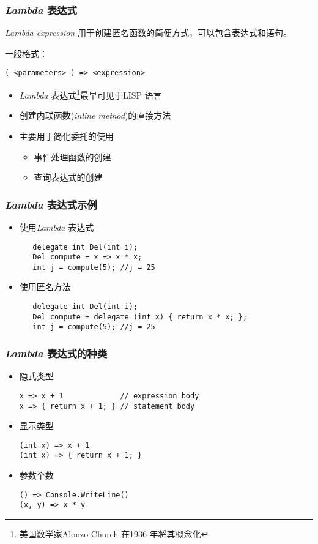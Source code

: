 \begin{frame}[fragile]
\frametitle{\textit{Lambda} 表达式}
\begin{block}{\textit{Lambda expression}}
\CJKindent 用于创建匿名函数的简便方式，可以包含表达式和语句。
\end{block}
一般格式：
\begin{lstlisting}[escapeinside=<>]
   ( <parameters> ) => <expression>
\end{lstlisting}
\begin{itemize}
\item \textit{Lambda} 表达式\footnote{美国数学家Alonzo Church 在1936 年将其概念化}最早可见于LISP 语言
\item 创建内联函数(\textit{inline method})的直接方法
\item 主要用于简化委托的使用
\begin{itemize}
\item 事件处理函数的创建
\item 查询表达式的创建
\end{itemize}
\end{itemize}
\end{frame}

\begin{frame}[fragile]
\frametitle{\textit{Lambda} 表达式示例}
\begin{itemize}
\item 使用\textit{Lambda} 表达式
\begin{lstlisting}
   delegate int Del(int i);
   Del compute = x => x * x;
   int j = compute(5); //j = 25
\end{lstlisting}
\item 使用匿名方法
\begin{lstlisting}
   delegate int Del(int i);
   Del compute = delegate (int x) { return x * x; };
   int j = compute(5); //j = 25
\end{lstlisting}

\end{itemize}
\end{frame}

\begin{frame}[fragile]
\frametitle{\textit{Lambda} 表达式的种类}
\begin{itemize}
\item 隐式类型
\begin{lstlisting}
x => x + 1             // expression body
x => { return x + 1; } // statement body
\end{lstlisting}
\item 显示类型
\begin{lstlisting}
(int x) => x + 1
(int x) => { return x + 1; }
\end{lstlisting}
\item 参数个数
\begin{lstlisting}
() => Console.WriteLine()
(x, y) => x * y
\end{lstlisting}
\end{itemize}
\end{frame}

